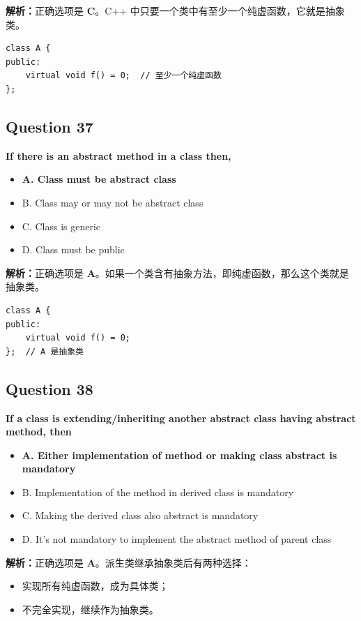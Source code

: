\documentclass[11pt, a4paper]{article}
\begin{document}
\textbf{解析：}正确选项是 \textbf{C}。C++ 中只要一个类中有至少一个纯虚函数，它就是抽象类。
\begin{lstlisting}
class A {
public:
    virtual void f() = 0;  // 至少一个纯虚函数
};
\end{lstlisting}


\subsection*{Question 37}
\textbf{If there is an abstract method in a class then, \underline{\hspace{2cm}}}
\begin{itemize}
    \item \textbf{A. Class must be abstract class}
    \item B. Class may or may not be abstract class
    \item C. Class is generic
    \item D. Class must be public
\end{itemize}

\textbf{解析：}正确选项是 \textbf{A}。如果一个类含有抽象方法，即纯虚函数，那么这个类就是抽象类。
\begin{lstlisting}
class A {
public:
    virtual void f() = 0;
};  // A 是抽象类
\end{lstlisting}


\subsection*{Question 38}
\textbf{If a class is extending/inheriting another abstract class having abstract method, then \underline{\hspace{2cm}}}
\begin{itemize}
    \item \textbf{A. Either implementation of method or making class abstract is mandatory}
    \item B. Implementation of the method in derived class is mandatory
    \item C. Making the derived class also abstract is mandatory
    \item D. It’s not mandatory to implement the abstract method of parent class
\end{itemize}

\textbf{解析：}正确选项是 \textbf{A}。派生类继承抽象类后有两种选择：
\begin{itemize}
    \item 实现所有纯虚函数，成为具体类；
    \item 不完全实现，继续作为抽象类。
\end{itemize}
\end{document}
